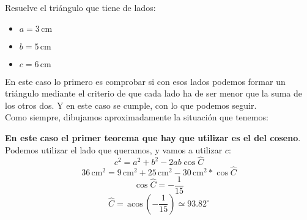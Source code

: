 \documentclass[a4paper,11pt,answers]{exam}
\newcommand{\degree}{^\circ}
\newcommand{\acos}{\,\mathrm{acos}\,}
\newcommand\unidad[1]{\,\text{#1}}
\begin{document}
Resuelve el triángulo que tiene de lados:
\begin{itemize}
\item $a=3\unidad{cm}$
\item $b=5\unidad{cm}$
\item $c=6\unidad{cm}$
\end{itemize}
\begin{solution}
  En este caso lo primero es comprobar si con esos lados podemos formar un triángulo mediante el
  criterio de que cada lado ha de ser menor que la suma de los otros dos. Y en este caso se cumple,
  con lo que podemos seguir.\\

  Como siempre, dibujamos aproximadamente la situación que tenemos:
  \begin{center}
  \end{center}
  \textbf{En este caso el primer teorema que hay que utilizar es el del coseno}. Podemos utilizar el
  lado que queramos, y vamos a utilizar $c$:
  \[c^2 = a^2 + b^2 - 2ab\cos \widehat{C}\]
  \[36\unidad{cm}^2 = 9\unidad{cm}^2 + 25\unidad{cm}^2 - 30\unidad{cm}^2 * \cos \widehat{C}\]
  \[\cos \widehat{C} = -\frac{1}{15}\]
  \[\widehat{C} = \acos \left(-\frac{1}{15}\right) \simeq 93.82\degree\]


\end{solution}
\end{document}
